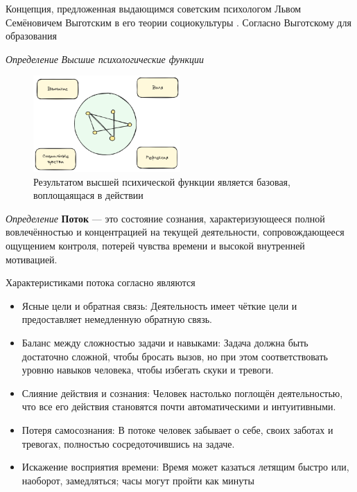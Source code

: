 Концепция, предложенная выдающимся советским психологом Львом Семёновичем Выготским
в его теории социокультуры \cite{выготский2014мышлениеw}. Согласно Выготскому для образования 


\textit{Определение} \textit{Высшие психологические функции}

\begin{figure}[h]
    \centering
    \includegraphics[width=0.5\textwidth]{assets/pedagogic/psy/vpf.excalidraw.png}
    \caption{Результатом высшей психической функции является базовая, воплощаящася в действии}
    \label{vpf}
\end{figure}










\textit{Определение} \textbf{Поток} — это состояние сознания, характеризующееся полной вовлечённостью и концентрацией
на текущей деятельности, сопровождающееся ощущением контроля, потерей чувства времени и высокой внутренней мотивацией.

Характеристиками потока согласно \cite{csikszentmihalyi2005flow} являются \begin{itemize}
    \item Ясные цели и обратная связь: Деятельность имеет чёткие цели и предоставляет немедленную обратную связь.
    \item Баланс между сложностью задачи и навыками: Задача должна быть достаточно сложной, чтобы бросать вызов, но при этом соответствовать уровню навыков человека, чтобы избегать скуки и тревоги.
    \item Слияние действия и сознания: Человек настолько поглощён деятельностью, что все его действия становятся почти автоматическими и интуитивными.
    \item Потеря самосознания: В потоке человек забывает о себе, своих заботах и тревогах, полностью сосредоточившись на задаче.
    \item Искажение восприятия времени: Время может казаться летящим быстро или, наоборот, замедляться; часы могут пройти как минуты
\end{itemize}

